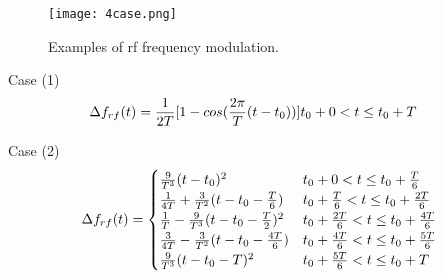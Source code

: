 %
%
%
\begin{figure}[H]
   \centering   
   \texttt{[image: 4case.png]}
   \caption{Examples of rf frequency modulation.}
   \label{4case}
\end{figure}

Case (1) 
\begin{eqnarray}\Delta f_{rf}(t)=
\frac{1}{2T}  [1-cos(\frac{2\pi}{T}(t-t_0))] &t_0+0<t\le t_0+T\cr  
\end{eqnarray}

Case (2) 
\begin{eqnarray}\Delta f_{rf}(t)= 
\begin{cases}
\frac{9}{T^3}(t-t_0)^2 &t_0+0<t\le t_0+\frac{T}{6}\cr  
\frac{1}{4T} +\frac{3}{T^2}(t-t_0 -\frac{T}{6}) &t_0+\frac{T}{6}<t\le t_0+\frac{2T}{6}\cr 
\frac{1}{T}-\frac{9}{T^3}(t-t_0-\frac{T}{2})^2 &t_0+\frac{2T}{6}<t\le t_0+\frac{4T}{6}\cr  
\frac{3}{4T} -\frac{3}{T^2}(t-t_0 -\frac{4T}{6})  &t_0+\frac{4T}{6}<t\le t_0+\frac{5T}{6}\cr  
\frac{9}{T^3}(t-t_0-T)^2 &t_0+\frac{5T}{6}<t\le t_0+T\cr  
\end{cases}
\end{eqnarray}

